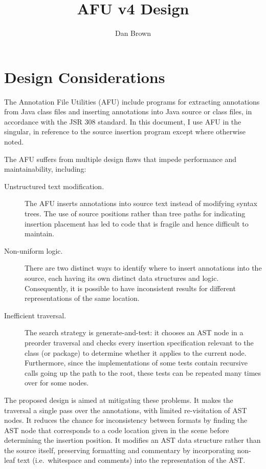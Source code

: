 \documentclass{article}
\title{AFU v4 Design}
\author{Dan Brown}
\begin{document}
\maketitle

\section{Design Considerations}

The Annotation File Utilities (AFU) include programs for extracting
annotations from Java class files and inserting annotations into Java
source or class files, in accordance with the JSR 308 standard. In this
document, I use AFU in the singular, in reference to the source
insertion program except where otherwise noted.

The AFU suffers from multiple design flaws that impede performance and
maintainability, including:

\begin{description}
\item[Unstructured text modification.]  The AFU inserts
annotations into source text instead of modifying syntax trees.
The use of source positions rather than tree paths for indicating
insertion placement has led to code that is fragile and hence difficult
to maintain.
\item[Non-uniform logic.]  There are two distinct ways to
identify where to insert annotations into the source, each having its
own distinct data structures and logic.  Consequently, it is possible to
have inconsistent results for different representations of the same
location.
\item[Inefficient traversal.]  The search strategy is
generate-and-test: it chooses an AST node in a preorder traversal and
checks every insertion specification relevant to the class (or package)
to determine whether it applies to the current node.  Furthermore, since
the implementations of some tests contain recursive calls going up the
path to the root, these tests can be repeated many times over for some
nodes.
\end{description}

The proposed design is aimed at mitigating these problems.  It makes
the traversal a single pass over the annotations, with limited
re-visitation of AST nodes.  It reduces the chance for inconsistency
between formats by finding the AST node that corresponds to a code
location given in the scene before determining the insertion position.
It modifies an AST data structure rather than the source itself,
preserving formatting and commentary by incorporating non-leaf text
(i.e.\ whitespace and comments) into the representation of the AST.
\end{document}

